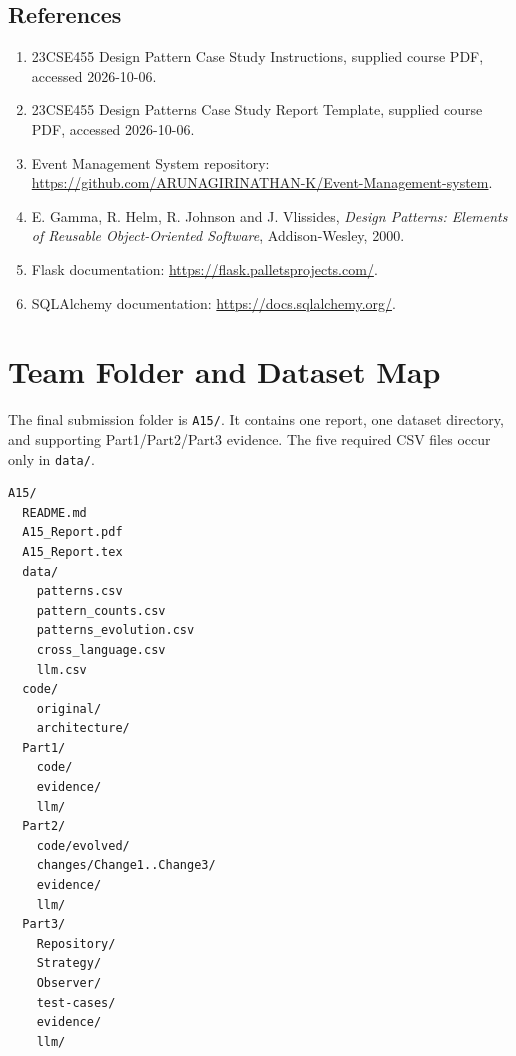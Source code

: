 \documentclass[11pt,a4paper]{article}
\begin{document}
\subsection{References}
\begin{enumerate}
\item 23CSE455 Design Pattern Case Study Instructions, supplied course PDF, accessed 2026-10-06.
\item 23CSE455 Design Patterns Case Study Report Template, supplied course PDF, accessed 2026-10-06.
\item Event Management System repository: \url{https://github.com/ARUNAGIRINATHAN-K/Event-Management-system}.
\item E. Gamma, R. Helm, R. Johnson and J. Vlissides, \emph{Design Patterns: Elements of Reusable Object-Oriented Software}, Addison-Wesley, 2000.
\item Flask documentation: \url{https://flask.palletsprojects.com/}.
\item SQLAlchemy documentation: \url{https://docs.sqlalchemy.org/}.
\end{enumerate}

\section{Team Folder and Dataset Map}
The final submission folder is \texttt{A15/}. It contains one report, one dataset directory, and supporting Part1/Part2/Part3 evidence. The five required CSV files occur only in \texttt{data/}.
\begin{verbatim}
A15/
  README.md
  A15_Report.pdf
  A15_Report.tex
  data/
    patterns.csv
    pattern_counts.csv
    patterns_evolution.csv
    cross_language.csv
    llm.csv
  code/
    original/
    architecture/
  Part1/
    code/
    evidence/
    llm/
  Part2/
    code/evolved/
    changes/Change1..Change3/
    evidence/
    llm/
  Part3/
    Repository/
    Strategy/
    Observer/
    test-cases/
    evidence/
    llm/
\end{verbatim}
\end{document}
